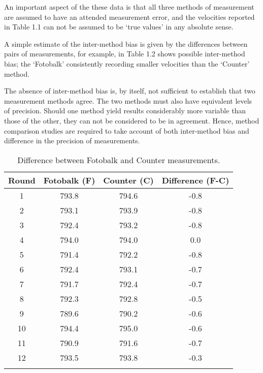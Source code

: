 \documentclass[12pt, a4paper]{report}
\theoremstyle{plain}
\theoremstyle{definition}
\theoremstyle{remark}
\begin{document}
	An important aspect of the these data is that all three methods of
	measurement are assumed to have an attended measurement error, and
	the velocities reported in Table 1.1 can not be assumed to be
	`true values' in any absolute sense.
	
	 A simple estimate of the
	inter-method bias is given by the differences between pairs of measurements, for example, in Table 1.2 shows possible inter-method bias; the `Fotobalk' consistently recording
	smaller velocities than the `Counter' method. 
	
	The absence of inter-method bias is, by itself, not sufficient to
	establish that two measurement methods agree. The two methods
	must also have equivalent levels of precision. Should one method
	yield results considerably more variable than those of the other,
	they can not be considered to be in agreement. 
	Hence, method comparison studies are required to take account of both inter-method bias and difference in the precision of measurements.
	\begin{table}[h!]
		
		\begin{center}
			\phantom{MAKESPACE}
			\begin{tabular}{cccc}
				\hline
				Round & Fotobalk (F) & Counter (C) & Difference (F-C) \\
				\hline
				1 & 793.8& 794.6 & -0.8 \\
				2 & 793.1 & 793.9 & -0.8 \\
				3 & 792.4 & 793.2 & -0.8 \\
				4 & 794.0 & 794.0 & 0.0 \\
				5 & 791.4 & 792.2 & -0.8 \\
				6 & 792.4 & 793.1 & -0.7 \\
				7 & 791.7 & 792.4 & -0.7 \\
				8 & 792.3 & 792.8 & -0.5 \\
				9 & 789.6 & 790.2 & -0.6 \\
				10 & 794.4 & 795.0 & -0.6 \\
				11 & 790.9 & 791.6 & -0.7 \\
				12 & 793.5 & 793.8 & -0.3 \\
				\phantom{MAKESPACE} & \phantom{MAKESPACE} &\phantom{MAKESPACE} & \phantom{MAKESP}\\
			\end{tabular}
			\caption{Difference between Fotobalk and Counter measurements.}
		\end{center}
	\end{table}
	
\end{document}
